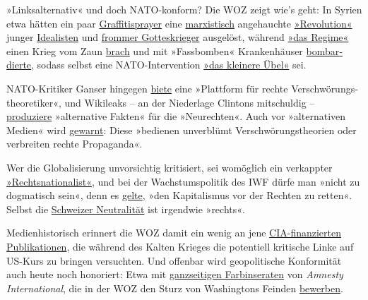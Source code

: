 »Linksalternativ« und doch NATO-konform? Die WOZ zeigt wie's geht: In
Syrien etwa hätten ein paar
\href{https://www.woz.ch/1203/syrien/assad-geht-das-licht-aus}{Graffiti­sprayer}
eine
\href{https://www.woz.ch/1616/syriens-zukunft/assads-spiel-mit-dem-westen}{marxis­tisch}
ange­hauchte
\href{https://www.woz.ch/1511/kommentar-von-francois-moore/die-revolution-in-syrien-ist-am-ende}{»Revo­lution«}
junger
\href{https://www.woz.ch/1606/syrien/mithilfe-dieser-verdammten-russen-wird-dieser-bastard-noch-ueberleben}{Idealisten}
und \href{https://www.woz.ch/1235/syrien/kaempfen-und-beten}{frommer
Gottes­krieger} ausgelöst, während
\href{https://www.woz.ch/1324/syrien/ein-land-zersplittert-immer-mehr}{»das
Regime«} einen Krieg vom Zaun
\href{https://www.woz.ch/1321/syrien-und-der-westen/assad-kann-nur-gewinnen}{brach}
und mit »Fass­bomben« Kranken­häuser
\href{https://www.woz.ch/1416/syrien/fassbomben-gottes-wille-und-demokratie}{bombar­dierte},
sodass selbst eine NATO-Inter­vention
\href{https://www.woz.ch/1335/syrien/intervention-als-kleineres-uebel}{»das
kleinere Übel«} sei.

NATO-Kritiker Ganser hingegen
\href{https://www.woz.ch/1703/wahrheit-und-verschwoerung/das-ganser-phaenomen}{biete}
eine »Plattform für rechte Ver­schwö­rungs­theo­retiker«, und Wiki­leaks
-- an der Nieder­lage Clintons mitschuldig --
\href{https://www.woz.ch/1711/cia-dokumente/die-alternativen-fakten-von-wikileaks}{produziere}
»alter­native Fakten« für die »Neurechten«. Auch vor »alter­na­tiven
Medien« wird
\href{https://www.woz.ch/1743/qualitaet-der-medien/unterinformiert-und-ausgeliefert}{gewarnt}:
Diese »bedienen unverblümt Ver­schwörungs­theorien oder ver­breiten
rechte Propaganda«.

Wer die Global­isierung unvor­sichtig kriti­siert, sei womöglich ein
verkappter
\href{https://www.woz.ch/1708/wirtschaftlicher-protektionismus/die-voelkische-kritik-an-der-globalisierung}{»Rechts­nationa­list«},
und bei der Wachs­tums­politik des IWF dürfe man »nicht zu dogma­tisch
sein«, denn es
\href{https://www.woz.ch/1742/weltwirtschaft/die-hueterin-des-kapitalismus}{gelte},
»den Kapita­lismus vor der Rechten zu retten«. Selbst die
\href{https://www.woz.ch/1414/schweizerische-aussenpolitik/opportunistische-neutralitaet}{Schweizer
Neutra­lität} ist irgendwie »rechts«.

Medien­historisch erinnert die WOZ damit ein wenig an jene
\href{https://www.youtube.com/watch?v=3QAgCFjNXJE}{CIA-finanzierten
Publika­tionen}, die während des Kalten Krieges die potentiell kritische
Linke auf US-Kurs zu bringen versuchten. Und offenbar wird
geo­poli­tische Konfor­mität auch heute noch honoriert: Etwa mit
\href{https://swprs.files.wordpress.com/2017/10/amnesty-international-werbung.png}{ganz­seitigen
Farb­inseraten} von \emph{Amnesty Inter­national}, die in der WOZ den
Sturz von Washingtons Feinden
\href{https://consortiumnews.com/2012/06/18/amnestys-shilling-for-us-wars/}{bewerben}.

